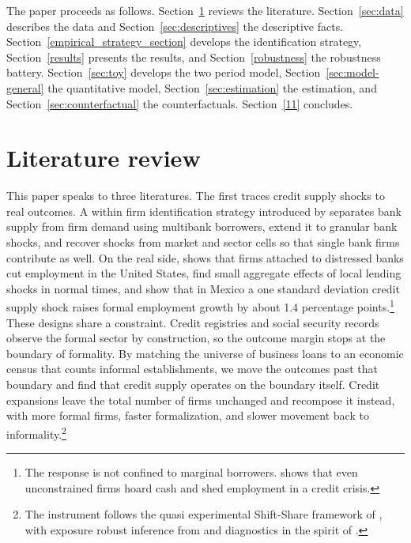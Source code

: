 \documentclass[12pt]{article}
\begin{document}
The paper proceeds as follows. Section~\ref{2} reviews the literature. Section~\ref{sec:data} describes the data and Section~\ref{sec:descriptives} the descriptive facts. Section~\ref{empirical_strategy_section} develops the identification strategy, Section~\ref{results} presents the results, and Section~\ref{robustness} the robustness battery. Section~\ref{sec:toy} develops the two period model, Section~\ref{sec:model-general} the quantitative model, Section~\ref{sec:estimation} the estimation, and Section~\ref{sec:counterfactual} the counterfactuals. Section~\ref{11} concludes.

\section{Literature review} \label{2}

This paper speaks to three literatures. The first traces credit supply shocks to real outcomes. A within firm identification strategy introduced by \citet{khwaja2008tracing} separates bank supply from firm demand using multibank borrowers, \citet{amiti2018much} extend it to granular bank shocks, and \citet{degryse2019identifying} recover shocks from market and sector cells so that single bank firms contribute as well. On the real side, \citet{chodorow2014employment} shows that firms attached to distressed banks cut employment in the United States, \citet{greenstone2020credit} find small aggregate effects of local lending shocks in normal times, and \citet{gutierrez2023credit} show that in Mexico a one standard deviation credit supply shock raises formal employment growth by about 1.4 percentage points.\footnote{The response is not confined to marginal borrowers. \citet{melcangi2024precautionary} shows that even unconstrained firms hoard cash and shed employment in a credit crisis.} These designs share a constraint. Credit registries and social security records observe the formal sector by construction, so the outcome margin stops at the boundary of formality. By matching the universe of business loans to an economic census that counts informal establishments, we move the outcomes past that boundary and find that credit supply operates on the boundary itself. Credit expansions leave the total number of firms unchanged and recompose it instead, with more formal firms, faster formalization, and slower movement back to informality.\footnote{The instrument follows the quasi experimental Shift-Share framework of \citet{borusyak2022quasi}, with exposure robust inference from \citet{adao2019shiftshare} and diagnostics in the spirit of \citet{goldsmith2020bartik}.}
\end{document}
